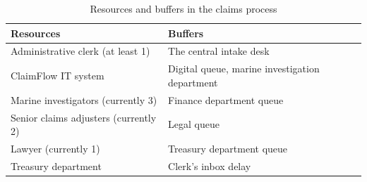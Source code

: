 \begin{table}[h]
\centering
\begin{tabular}{ll}
\toprule
\textbf{Resources} & \textbf{Buffers} \\
\midrule
Administrative clerk (at least 1) & The central intake desk \\
ClaimFlow IT system & Digital queue, marine investigation department \\
Marine investigators (currently 3) & Finance department queue \\
Senior claims adjusters (currently 2) & Legal queue \\
Lawyer (currently 1) & Treasury department queue \\
Treasury department & Clerk's inbox delay \\
\bottomrule
\end{tabular}
\caption{Resources and buffers in the claims process}
\label{tab:resources_buffers}
\end{table}
